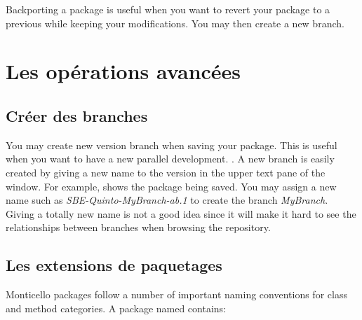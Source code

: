 \documentclass[a4paper,10pt,twoside]{book}
\begin{document}
Backporting a package is useful when you want to revert your package to a previous while keeping your modifications. You may then create a new branch.


\section{Les op\'erations avanc\'ees}

\subsection{Cr\'eer des branches} %

You may create new version branch when saving your package. This is useful when you want to have a new parallel development. 
.  A new branch is easily created by giving a new name to the version in the upper text pane of the  window. For example,  shows the package  being saved. You may assign a new name such as \emph{SBE-Quinto-MyBranch-ab.1} to create the branch \emph{MyBranch}. Giving a totally new name is not a good idea since it will make it hard to see the relationships between branches when browsing the repository. 


\subsection{Les extensions de paquetages} %
Monticello packages follow a number of important naming conventions for class and method categories.
A package named  contains:
\end{document}

